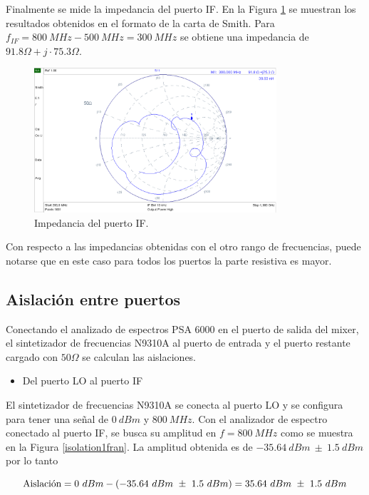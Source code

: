 \documentclass[a4paper,10pt]{article}
\begin{document}
	\indent Finalmente se mide la impedancia del puerto IF. En la Figura \ref{impedancia3fran} se muestran los resultados obtenidos en el formato de la carta de Smith. Para $f_{IF}=800~MHz-500~MHz=300~MHz$ se obtiene una impedancia de $91.8\Omega+j\cdot75.3\Omega$.
	
	\begin{figure}[!htb]
		\centering
		\includegraphics[width=9cm]{Images/impIFvieja.png}
		\caption{Impedancia del puerto IF.}
		\label{impedancia3fran}
	\end{figure}			
	Con respecto a las impedancias obtenidas con el otro rango de frecuencias, puede notarse que en este caso para todos los puertos la parte resistiva es mayor.
	
	\subsection{Aislación entre puertos}
	\indent Conectando el analizado de espectros PSA 6000 en el puerto de salida del mixer, el sintetizador de frecuencias N9310A al puerto de entrada y el puerto restante cargado con $50\Omega$ se calculan las aislaciones.
	
	\begin{itemize}
		\item Del puerto LO al puerto IF
	\end{itemize}
	
	\indent El sintetizador de frecuencias N9310A se conecta al puerto LO y se configura para tener una se\~nal de $0~dBm$ y $800~MHz$. Con el analizador de espectro conectado al puerto IF, se busca su amplitud en $f=800~MHz$ como se muestra en la Figura \ref{isolation1fran}. La amplitud obtenida es de $-35.64~dBm~\pm~1.5~dBm$ por lo tanto
	
	$$\textmd{Aislaci\'on}=0~dBm-(-35.64~dBm~\pm~1.5~dBm)=35.64~dBm~\pm~1.5~dBm$$
	
\end{document}
